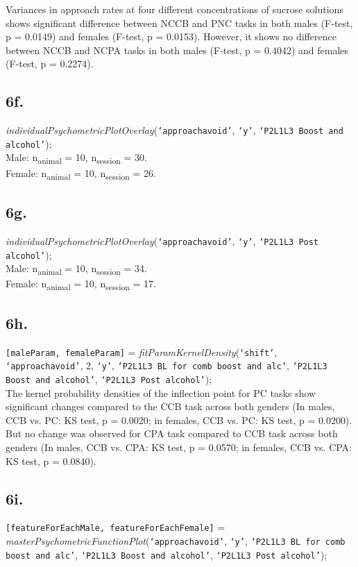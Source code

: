 \documentclass{article}
\begin{document}
Variances in approach rates at four different concentrations of sucrose solutions shows significant difference between NCCB and PNC tasks in both males (F-test, p = 0.0149) and females (F-test, p = 0.0153). However, it shows no difference between NCCB and NCPA tasks in both males (F-test, p = 0.4042) and females (F-test, p = 0.2274).

\subsection{6f.}
\emph{individualPsychometricPlotOverlay}(\texttt{`approachavoid'}, \texttt{`y'}, \texttt{`P2L1L3 Boost and alcohol'});\\
Male: n\textsubscript{animal} = 10, n\textsubscript{session} = 30.\\
Female: n\textsubscript{animal} = 10, n\textsubscript{session} = 26.\\

\subsection{6g.}
\emph{individualPsychometricPlotOverlay}(\texttt{`approachavoid'}, \texttt{`y'}, \texttt{`P2L1L3 Post alcohol'});\\
Male: n\textsubscript{animal} = 10, n\textsubscript{session} = 34.\\
Female: n\textsubscript{animal} = 10, n\textsubscript{session} = 17.\\

\subsection{6h.}
\texttt{[maleParam, femaleParam]} = \emph{fitParamKernelDensity}(\texttt{`shift'}, \texttt{`approachavoid'}, 2, \texttt{`y'}, \texttt{`P2L1L3 BL for comb boost and alc'}, \texttt{`P2L1L3 Boost and alcohol'}, \texttt{`P2L1L3 Post alcohol'});\\

The kernel probability densities of the inflection point for PC tasks show significant changes compared to the CCB task across both genders (In males, CCB vs. PC: KS test, p = 0.0020; in females, CCB vs. PC: KS test, p = 0.0200). But no change was observed for CPA task compared to CCB task across both genders (In males, CCB vs. CPA: KS test, p = 0.0570; in females, CCB vs. CPA: KS test, p = 0.0840).

\subsection{6i.}
\texttt{[featureForEachMale, featureForEachFemale]} = \emph{masterPsychometricFunctionPlot}(\texttt{`approachavoid'}, \texttt{`y'}, \texttt{`P2L1L3 BL for comb boost and alc'}, \texttt{`P2L1L3 Boost and alcohol'}, \texttt{`P2L1L3 Post alcohol'});\\
\end{document}
